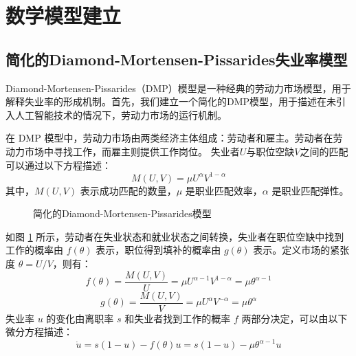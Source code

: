 \documentclass{article}
\begin{document}
\section{数学模型建立}

\subsection{简化的Diamond-Mortensen-Pissarides失业率模型}

Diamond-Mortensen-Pissarides（DMP）模型\cite{diamond1982aggregate}\cite{mortensen1982property}是一种经典的劳动力市场模型，用于解释失业率的形成机制。首先，我们建立一个简化的DMP模型，用于描述在未引入人工智能技术的情况下，劳动力市场的运行机制。

在 DMP 模型中，劳动力市场由两类经济主体组成：劳动者和雇主。劳动者在劳动力市场中寻找工作，而雇主则提供工作岗位。
失业者$U$与职位空缺$V$之间的匹配可以通过以下方程描述：
\begin{equation}
    M(U, V) = \mu U^\alpha V^{1-\alpha}
\end{equation}
其中，$M(U, V)$ 表示成功匹配的数量，$\mu$ 是职业匹配效率，$\alpha$ 是职业匹配弹性。
\begin{figure}[htbp]
    \centering
    \caption{简化的Diamond-Mortensen-Pissarides模型}
    \label{fig:dmp}
\end{figure}
如图 \ref{fig:dmp} 所示，劳动者在失业状态和就业状态之间转换，失业者在职位空缺中找到工作的概率由 $f(\theta)$ 表示，职位得到填补的概率由 $g(\theta)$ 表示。定义市场的紧张度 $\theta = U / V$，则有：
\begin{equation}
    f(\theta) = \frac{M(U, V)}{U} = \mu U^{\alpha-1} V^{1-\alpha} = \mu \theta^{\alpha-1}
\end{equation}
\begin{equation}
    g(\theta) = \frac{M(U, V)}{V} = \mu U^\alpha V^{-\alpha} = \mu \theta^{\alpha}
\end{equation}
失业率 $u$ 的变化由离职率 $s$ 和失业者找到工作的概率 $f$ 两部分决定，可以由以下微分方程描述：
\begin{equation}
    \dot{u} = s(1 - u) - f(\theta) u = s(1 - u) - \mu \theta^{\alpha-1} u
    \label{eq:dmp}
\end{equation}
\end{document}
